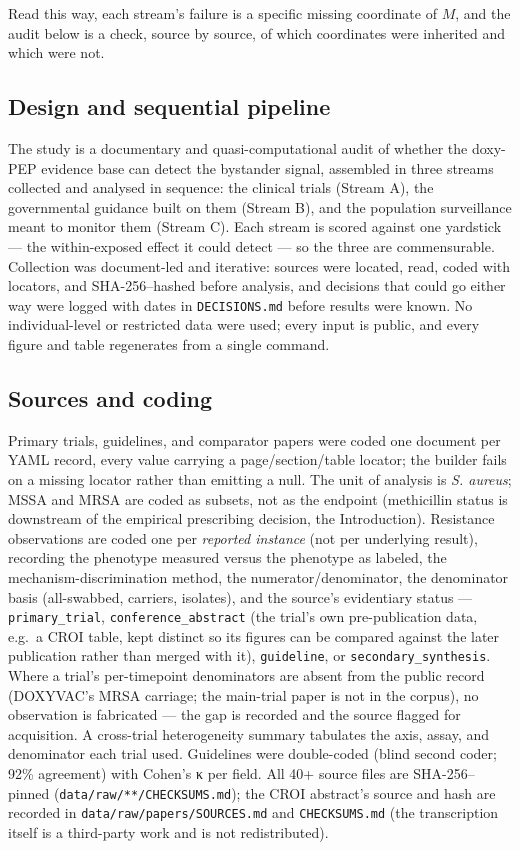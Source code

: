 \documentclass[10pt,letterpaper]{article}
\begin{document}
Read this way, each stream's failure is a specific missing coordinate of
\(M\), and the audit below is a check, source by source, of which
coordinates were inherited and which were not.

\subsection*{Design and sequential pipeline}

The study is a documentary and quasi-computational audit of whether the
doxy-PEP evidence base can detect the bystander signal, assembled in
three streams collected and analysed in sequence: the clinical trials
(Stream A), the governmental guidance built on them (Stream B), and the
population surveillance meant to monitor them (Stream C). Each stream is
scored against one yardstick --- the within-exposed effect it could
detect --- so the three are commensurable. Collection was document-led
and iterative: sources were located, read, coded with locators, and
SHA-256--hashed before analysis, and decisions that could go either way
were logged with dates in \texttt{DECISIONS.md} before results were
known. No individual-level or restricted data were used; every input is
public, and every figure and table regenerates from a single command.

\subsection*{Sources and coding}

Primary trials, guidelines, and comparator papers were coded one
document per YAML record, every value carrying a page/section/table
locator; the builder fails on a missing locator rather than emitting a
null. The unit of analysis is \emph{S. aureus}; MSSA and MRSA are coded
as subsets, not as the endpoint (methicillin status is downstream of the
empirical prescribing decision, the Introduction). Resistance
observations are coded one per \emph{reported instance} (not per
underlying result), recording the phenotype measured versus the
phenotype as labeled, the mechanism-discrimination method, the
numerator/denominator, the denominator basis (all-swabbed, carriers,
isolates), and the source's evidentiary status ---
\texttt{primary\_trial}, \texttt{conference\_abstract} (the trial's own
pre-publication data, e.g.~a CROI table, kept distinct so its figures
can be compared against the later publication rather than merged with
it), \texttt{guideline}, or \texttt{secondary\_synthesis}. Where a
trial's per-timepoint denominators are absent from the public record
(DOXYVAC's MRSA carriage; the main-trial paper is not in the corpus), no
observation is fabricated --- the gap is recorded and the source flagged
for acquisition. A cross-trial heterogeneity summary tabulates the axis, assay,
and denominator each trial used. Guidelines were double-coded (blind
second coder; 92\% agreement) with Cohen's κ per field. All 40+ source
files are SHA-256--pinned (\texttt{data/raw/**/CHECKSUMS.md}); the CROI
abstract's source and hash are recorded in
\texttt{data/raw/papers/SOURCES.md} and \texttt{CHECKSUMS.md} (the
transcription itself is a third-party work and is not redistributed).
\end{document}
